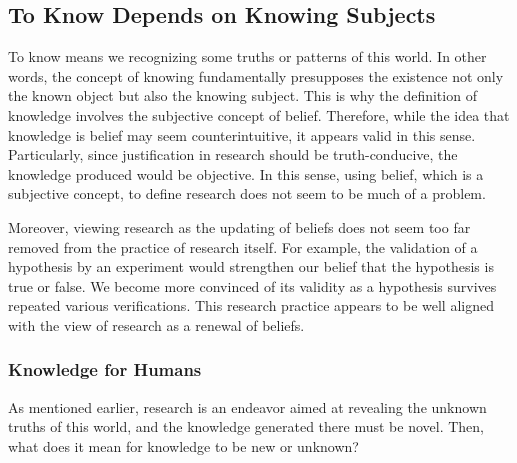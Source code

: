 

\subsection{To Know Depends on Knowing Subjects}

To know means we recognizing some truths or patterns of this world. In other words, the concept of knowing fundamentally presupposes the existence not only the known object but also the knowing subject. This is why the definition of knowledge involves the subjective concept of belief. Therefore, while the idea that knowledge is belief may seem counterintuitive, it appears valid in this sense. Particularly, since justification in research should be truth-conducive, the knowledge produced would be objective. In this sense, using belief, which is a subjective concept, to define research does not seem to be much of a problem.

Moreover, viewing research as the updating of beliefs does not seem too far removed from the practice of research itself. For example, the validation of a hypothesis by an experiment would strengthen our belief that the hypothesis is true or false. We become more convinced of its validity as a hypothesis survives repeated various verifications. This research practice appears to be well aligned with the view of research as a renewal of beliefs.


\subsubsection{Knowledge for Humans}
As mentioned earlier, research is an endeavor aimed at revealing the unknown truths of this world, and the knowledge generated there must be novel. Then, what does it mean for knowledge to be new or unknown?

